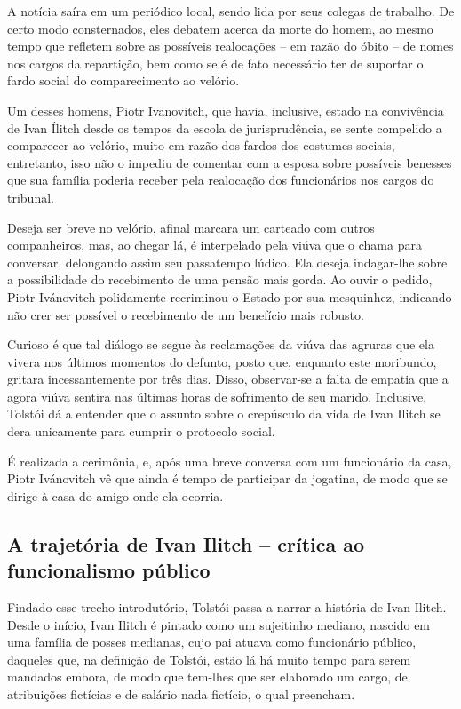 \documentclass[12pt]{extarticle}
\begin{document}
A notícia saíra em um periódico local, sendo lida por seus colegas de
trabalho. De certo modo consternados, eles debatem acerca da morte do
homem, ao mesmo tempo que refletem sobre as possíveis realocações -- em
razão do óbito -- de nomes nos cargos da repartição, bem como se é de
fato necessário ter de suportar o fardo social do comparecimento ao
velório.

Um desses homens, Piotr Ivanovitch, que havia, inclusive, estado na
convivência de Ivan Ílitch desde os tempos da escola de jurisprudência,
se sente compelido a comparecer ao velório, muito em razão dos fardos
dos costumes sociais, entretanto, isso não o impediu de comentar com a
esposa sobre possíveis benesses que sua família poderia receber pela
realocação dos funcionários nos cargos do tribunal.

Deseja ser breve no velório, afinal marcara um carteado com outros
companheiros, mas, ao chegar lá, é interpelado pela viúva que o chama
para conversar, delongando assim seu passatempo lúdico. Ela deseja
indagar-lhe sobre a possibilidade do recebimento de uma pensão mais
gorda. Ao ouvir o pedido, Piotr Ivánovitch polidamente recriminou o
Estado por sua mesquinhez, indicando não crer ser possível o recebimento
de um benefício mais robusto.

Curioso é que tal diálogo se segue às reclamações da viúva das agruras
que ela vivera nos últimos momentos do defunto, posto que, enquanto este
moribundo, gritara incessantemente por três dias. Disso, observar-se a
falta de empatia que a agora viúva sentira nas últimas horas de
sofrimento de seu marido. Inclusive, Tolstói dá a entender que o assunto
sobre o crepúsculo da vida de Ivan Ilitch se dera unicamente para
cumprir o protocolo social.

É realizada a cerimônia, e, após uma breve conversa com um funcionário
da casa, Piotr Ivánovitch vê que ainda é tempo de participar da
jogatina, de modo que se dirige à casa do amigo onde ela ocorria.

\subsection{A trajetória de Ivan Ilitch -- crítica ao funcionalismo público}

Findado esse trecho introdutório, Tolstói passa a narrar a história de
Ivan Ilitch. Desde o início, Ivan Ilitch é pintado como um sujeitinho
mediano, nascido em uma família de posses medianas, cujo pai atuava como
funcionário público, daqueles que, na definição de Tolstói, estão lá há
muito tempo para serem mandados embora, de modo que tem-lhes que ser
elaborado um cargo, de atribuições fictícias e de salário nada fictício,
o qual preencham.
\end{document}
